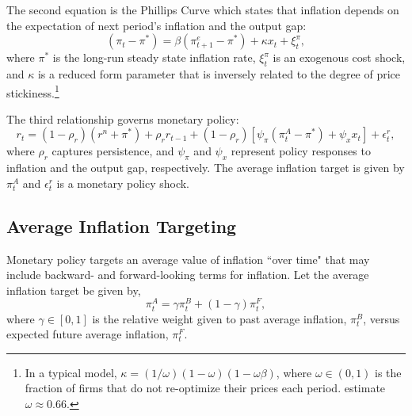 \documentclass[english,authoryear,12pt]{elsarticle}
\begin{document}
The second equation is the Phillips Curve which states that inflation depends on the expectation of next period's inflation and the output gap:
\begin{equation}\label{eq:PhillipsCurvee}
	(\pi_t - \pi^*) = \beta (\pi_{t+1}^e - \pi^*) + \kappa x_t + \xi_t^{\pi},
\end{equation}
where $\pi^*$ is the long-run steady state inflation rate, $\xi_t^\pi$ is an exogenous cost shock, and $\kappa$ is a reduced form parameter that is inversely related to the degree of price stickiness.\footnote{In a typical model, $\kappa=(1/\omega)(1-\omega)(1-\omega\beta)$, where $\omega \in (0,1)$ is the fraction of firms that do not re-optimize their prices each period. \citet{smetswouters2007} estimate $\omega \approx 0.66$.}

The third relationship governs monetary policy:
\begin{equation}\label{eq:TaylorRule}
	r_t = (1-\rho_r)(r^n + \pi^*) + \rho_r r_{t-1} + (1-\rho_r) \left[ \psi_\pi (\pi_t^A - \pi^*) + \psi_x x_t \right] + \epsilon_t^{r},
\end{equation}
where $\rho_r$ captures persistence, and $\psi_\pi$ and $\psi_x$ represent policy responses to inflation and the output gap, respectively. The average inflation target is given by $\pi_t^A$ and $\epsilon_t^r$ is a monetary policy shock.

\subsection{Average Inflation Targeting}

Monetary policy targets an average value of inflation ``over time" that may include backward- and forward-looking terms for inflation. Let the average inflation target be given by,
\begin{equation}
	\pi_t^A = \gamma \pi_t^B + (1-\gamma) \pi_t^F,
\end{equation}
where $\gamma \in [0,1]$ is the relative weight given to past average inflation, $\pi_t^B$, versus expected future average inflation, $\pi_t^F$. 
\end{document}
